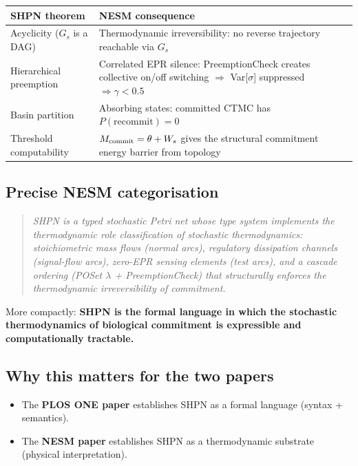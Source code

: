 \documentclass[11pt,a4paper]{article}
\begin{document}
\begin{center}
\begin{tabular}{p{4cm}p{7cm}}
\toprule
SHPN theorem & NESM consequence \\
\midrule
Acyclicity ($G_s$ is a DAG) & Thermodynamic irreversibility: no reverse
  trajectory reachable via $G_s$ \\
Hierarchical preemption & Correlated EPR silence: PreemptionCheck creates
  collective on/off switching $\Rightarrow$ Var[$\sigma$] suppressed
  $\Rightarrow \gamma < 0.5$ \\
Basin partition & Absorbing states: committed CTMC has
  $P(\text{recommit}) = 0$ \\
Threshold computability & $M_{\rm commit} = \theta + W_s$ gives the
  structural commitment energy barrier from topology \\
\bottomrule
\end{tabular}
\end{center}

\subsection*{Precise NESM categorisation}

\begin{quote}
\emph{SHPN is a typed stochastic Petri net whose type system implements
the thermodynamic role classification of stochastic thermodynamics:
stoichiometric mass flows (normal arcs), regulatory dissipation channels
(signal-flow arcs), zero-EPR sensing elements (test arcs), and a cascade
ordering (POSet $\lambda$ + PreemptionCheck) that structurally enforces
the thermodynamic irreversibility of commitment.}
\end{quote}

More compactly: \textbf{SHPN is the formal language in which the stochastic
thermodynamics of biological commitment is expressible and computationally
tractable.}

\subsection*{Why this matters for the two papers}

\begin{itemize}
  \item The \textbf{PLOS ONE paper} establishes SHPN as a formal language
    (syntax + semantics).
  \item The \textbf{NESM paper} establishes SHPN as a thermodynamic substrate
    (physical interpretation).
\end{itemize}
\end{document}
